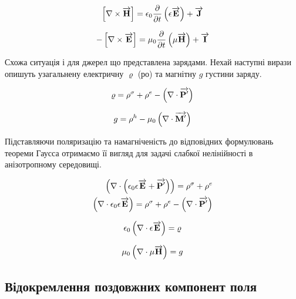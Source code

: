 \begin{equation} \label{eq:rotHfromE}
\left[ \nabla \times \overrightarrow{\mathbf H} \right] = 
\epsilon_0 \frac{\partial }{\partial t} \left( \epsilon \overrightarrow{\mathbf E} \right) + \overrightarrow{\mathbf J}
\end{equation}

\begin{equation} \label{eq:rotEfromH} 
- \left[ \nabla \times \overrightarrow{\mathbf E} \right] = 
\mu_0 \frac{\partial }{\partial t} \left( \mu \overrightarrow{\mathbf H} \right) + \overrightarrow{\mathbf I}
\end{equation}

Схожа ситуація і для джерел що представлена зарядами. Нехай наступні вирази
опишуть узагальнену електричну $ \varrho $ (ро) та магнітну $ g $ густини 
заряду.

\begin{equation*}
\varrho = \rho^\sigma + \rho^e - \left( \nabla \cdot \overrightarrow{\mathbf P^\prime} \right)
\end{equation*}

\begin{equation*}
g = \rho^h - \mu_0 \left( \nabla \cdot \overrightarrow{\mathbf M^\prime} \right)
\end{equation*}

Підставляючи поляризацію та намагніченість до відповідних формулювань теореми 
Гаусса отримаємо її вигляд для задачі слабкої нелінійності в анізотропному 
середовищі.

\textcolor{lightgray}{ \begin{equation*} \begin{aligned}
\left( \nabla \cdot  \left( \epsilon_0 \epsilon \overrightarrow{\mathbf E} + 
\overrightarrow{\mathbf P^\prime} \right)  \right) = \rho^\sigma + \rho^e \\
\left( \nabla \cdot  \epsilon_0 \epsilon \overrightarrow{\mathbf E}  \right) = \rho^\sigma + \rho^e -
\left( \nabla \cdot  \overrightarrow{\mathbf P^\prime}  \right)
\end{aligned} \end{equation*} }

\begin{equation} \label{eq:divE} 
\epsilon_0 \left( \nabla \cdot  \epsilon \overrightarrow{\mathbf E}  \right) = \varrho
\end{equation}

\begin{equation} \label{eq:divH}
\mu_0 \left( \nabla \cdot  \mu \overrightarrow{\mathbf H}  \right) = g
\end{equation}

\subsection{Відокремлення поздовжних компонент поля}

